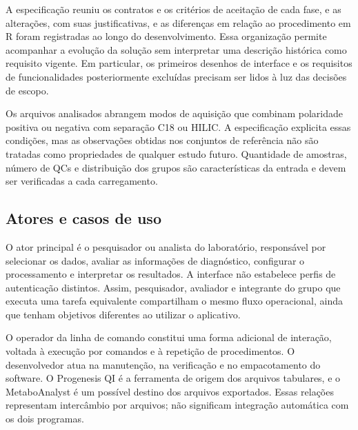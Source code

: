 A especificação reuniu os contratos e os critérios de aceitação de cada fase, e as alterações, com suas justificativas, e as diferenças em relação ao procedimento em R foram registradas ao longo do desenvolvimento. Essa organização permite acompanhar a evolução da solução sem interpretar uma descrição histórica como requisito vigente. Em particular, os primeiros desenhos de interface e os requisitos de funcionalidades posteriormente excluídas precisam ser lidos à luz das decisões de escopo.

Os arquivos analisados abrangem modos de aquisição que combinam polaridade positiva ou negativa com separação C18 ou HILIC. A especificação explicita essas condições, mas as observações obtidas nos conjuntos de referência não são tratadas como propriedades de qualquer estudo futuro. Quantidade de amostras, número de QCs e distribuição dos grupos são características da entrada e devem ser verificadas a cada carregamento.

\subsection{Atores e casos de uso}

O ator principal é o pesquisador ou analista do laboratório, responsável por selecionar os dados, avaliar as informações de diagnóstico, configurar o processamento e interpretar os resultados. A interface não estabelece perfis de autenticação distintos. Assim, pesquisador, avaliador e integrante do grupo que executa uma tarefa equivalente compartilham o mesmo fluxo operacional, ainda que tenham objetivos diferentes ao utilizar o aplicativo.

O operador da linha de comando constitui uma forma adicional de interação, voltada à execução por comandos e à repetição de procedimentos. O desenvolvedor atua na manutenção, na verificação e no empacotamento do software. O Progenesis QI é a ferramenta de origem dos arquivos tabulares, e o MetaboAnalyst é um possível destino dos arquivos exportados. Essas relações representam intercâmbio por arquivos; não significam integração automática com os dois programas.

